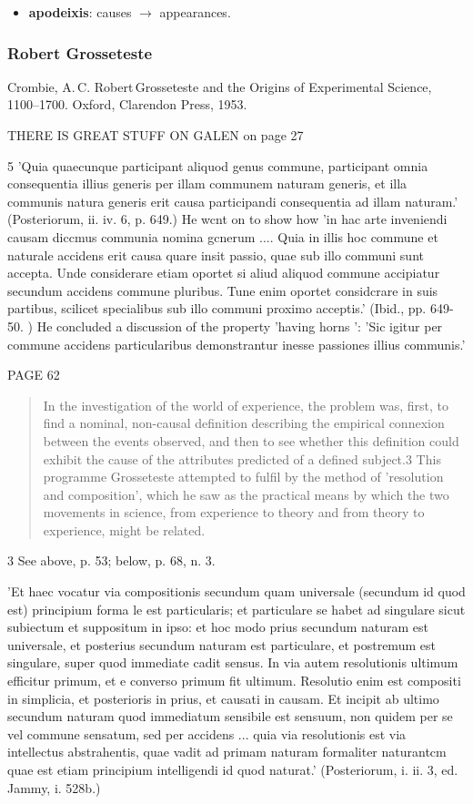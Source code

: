 \begin{itemize}
  \item \textbf{apodeixis}: causes $\rightarrow$ appearances.
\end{itemize}


\subsubsection{Robert Grosseteste}


Crombie, A. C. Robert Grosseteste and the Origins of Experimental Science, 1100–1700. Oxford, Clarendon Press, 1953.


THERE IS GREAT STUFF ON GALEN on page 27


5 'Quia quaecunque participant aliquod genus commune, participant omnia consequentia
illius generis per illam communem naturam generis, et illa communis natura
generis erit causa participandi consequentia ad illam naturam.' (Posteriorum, ii. iv. 6,
p. 649.) He wcnt on to show how 'in hac arte inveniendi causam diccmus communia
nomina gcnerum .... Quia in illis hoc commune et naturale accidens erit causa quare
insit passio, quae sub illo communi sunt accepta. Unde considerare etiam oportet si aliud
aliquod commune accipiatur secundum accidens commune pluribus. Tune enim oportet
considcrare in suis partibus, scilicet specialibus sub illo communi proximo acceptis.'
(Ibid., pp. 649-50. ) He concluded a discussion of the property 'having horns ':
'Sic igitur per commune accidens particularibus demonstrantur inesse passiones illius
communis.'


PAGE 62

\begin{quotation}
In the investigation of the world of experience, the problem was,
first, to find a nominal, non-causal definition describing the
empirical connexion between the events observed, and then to see
whether this definition could exhibit the cause of the attributes predicted
of a defined subject.3 This programme Grosseteste attempted
to fulfil by the method of 'resolution and composition', which he
saw as the practical means by which the two movements in science,
from experience to theory and from theory to experience, might be
related.
\end{quotation}

3 See above, p. 53; below, p. 68, n. 3.


'Et haec vocatur via compositionis secundum quam universale (secundum id quod est) principium forma le est particularis; et particulare se habet ad singulare sicut subiectum et suppositum in ipso: et hoc modo prius secundum naturam est universale, et posterius secundum naturam est particulare, et postremum est singulare, super quod immediate cadit sensus. In via autem resolutionis ultimum efficitur primum, et e converso primum fit ultimum. Resolutio enim est compositi in simplicia, et posterioris in prius, et causati in causam. Et incipit ab ultimo secundum naturam quod immediatum sensibile est sensuum, non quidem per se vel commune sensatum, sed per accidens ... quia via resolutionis est via intellectus abstrahentis, quae vadit ad primam naturam formaliter naturantcm quae est etiam principium intelligendi id quod naturat.' (Posteriorum, i. ii. 3, ed. Jammy, i. 528b.)

